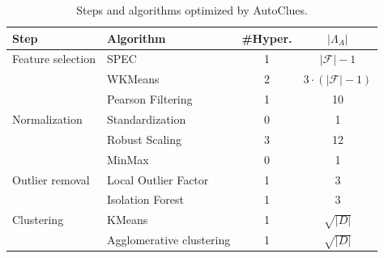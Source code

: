 \documentclass[runningheads]{llncs}
\begin{document}
\begin{table}[t]
    \centering
    \begin{tabular}{llcc}
        \hline
        Step     & Algorithm & \#Hyper. & $|\Lambda_A|$\\\hline
        Feature selection & SPEC \cite{zhao2007spectral} & 1 & $|\mathcal{F}|-1$\\
         & WKMeans \cite{WKMeans} & 2 & $3 \cdot (|\mathcal{F}|-1)$\\
         & Pearson Filtering & 1 & 10\\
        Normalization     & Standardization & 0 & 1\\
        & Robust Scaling & 3 & 12\\
        & MinMax & 0 & 1\\
        Outlier removal   & Local Outlier Factor \cite{breunig2000lof} & 1 & 3\\
        & Isolation Forest \cite{liu2012isolation} & 1 & 3\\
        Clustering  & KMeans \cite{arthur2006k} & 1 & $\sqrt{|D|}$\\
        & Agglomerative clustering  \cite{murtagh2017algorithms} & 1 & $\sqrt{|D|}$\\\hline
    \end{tabular}
    \caption{Steps and algorithms optimized by AutoClues.}
    \label{tbl:processing}
\end{table}
\end{document}
